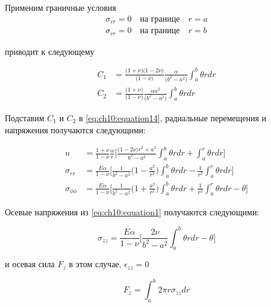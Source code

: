 Применим граничные условия
\begin{equation}
	\label{eq:ch10:equation16}
	\begin{split}
		\sigma_{rr} = 0 \quad \text{на границе} \quad r=a\\
		\sigma_{rr} = 0 \quad \text{на границе} \quad r=b
	\end{split}
\end{equation}

приводит к следующему

\begin{equation*}
	\begin{split}
		C_1 &= \frac{\big(1+\nu \big)\big(1-2\nu \big)}{\big(1-\nu \big)}  \frac{\alpha}{\big(b^2-a^2 \big)} \int_a^b \theta rdr\\
		C_2 &= \frac{\big(1+\nu \big)}{\big(1-\nu \big)}\frac{\alpha a^2}{\big(b^2-a^2 \big)}\int_a^b \theta rdr
	\end{split}
\end{equation*}

Подставим \(C_1\) и \(C_2\) в \cref{eq:ch10:equation14}, радиальные перемещения и напряжения получаются следующими:

\begin{equation}
	\label{eq:ch10:equation17}
	\begin{split}
		u &= \frac{1+\nu}{1-\nu} \frac{\alpha}{r} \big[ \frac{\big( 1-2\nu \big) r^2 +a^2}{b^2-a^2} \int_a^b \theta rdr + \int_a^r \theta r dr\big]\\
		\sigma_{rr} &= \frac{E \alpha}{1-\nu}\big[ \frac{1}{b^2-a^2} \big(1-\frac{a^2}{r^2} \big)\int_a^b \theta rdr -\frac{1}{r^2}\int_a^r \theta r dr\big]\\
		\sigma_{\phi\phi} &= \frac{E \alpha}{1-\nu}\big[ \frac{1}{b^2-a^2}\big(1+\frac{a^2}{r^2} \big)\int_a^b \theta rdr +\frac{1}{r^2}\int_a^r \theta r dr - \theta \big]
	\end{split}
\end{equation}	
	
Осевые напряжения из \cref{eq:ch10:equation1}	получаются следующими:

\begin{equation}
	\label{eq:ch10:equation18}
	\sigma_{zz} = \frac{E \alpha}{1-\nu}\big[ \frac{2\nu}{b^2-a^2}\int_a^b \theta rdr  - \theta \big]	
\end{equation}

и осевая сила \(F_z\) в этом случае, \(\epsilon_{zz}=0\)

\begin{equation}
	\label{eq:ch10:equation19}
	F_z = \int_a^b 2 \pi r \sigma_{zz} dr
\end{equation}


